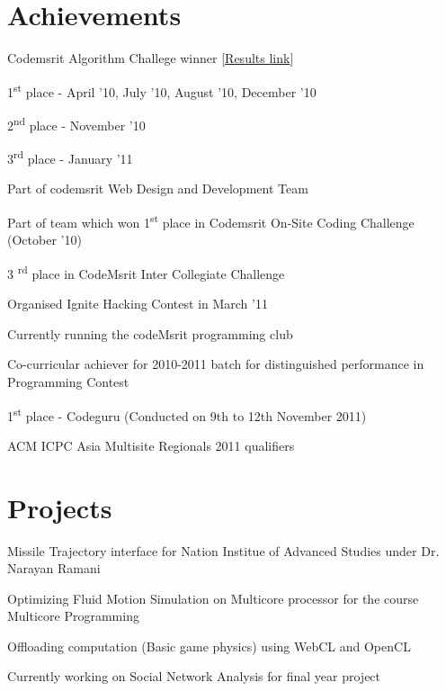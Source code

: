 \begin{resume}
\section{\sc Achievements }
\begin{list2}
 \item Codemsrit Algorithm Challege winner [\href{http://www.code.vrglinug.org/results.php}{Results link}] 
\begin{list2}
  \item 1\textsuperscript{st} place -  April '10, July '10, August '10, December '10   
  \item 2\textsuperscript{nd} place - November '10
  \item 3\textsuperscript{rd} place - January '11
\end{list2}
 \item Part of codemsrit Web Design and Development Team
 \item Part of team which won 1\textsuperscript{st} place in Codemsrit On-Site Coding Challenge (October '10)
 \item 3 \textsuperscript{rd} place in CodeMsrit Inter Collegiate Challenge 
 \item Organised Ignite Hacking Contest in March '11
 \item Currently running the codeMsrit programming club
 \item Co-curricular achiever for 2010-2011 batch for distinguished performance in Programming Contest
 \item 1\textsuperscript{st} place - Codeguru (Conducted on 9th to 12th November 2011)
 \item ACM ICPC Asia Multisite Regionals 2011 qualifiers
 \end{list2}

\section{\sc Projects}
\begin{list2}
\item Missile Trajectory interface for Nation Institue of Advanced Studies under Dr. Narayan Ramani
\item Optimizing Fluid Motion Simulation on Multicore processor for the course Multicore Programming
\item Offloading computation (Basic game physics) using WebCL and OpenCL
\item Currently working on Social Network Analysis for final year project
 \end{list2}
\end{resume}

